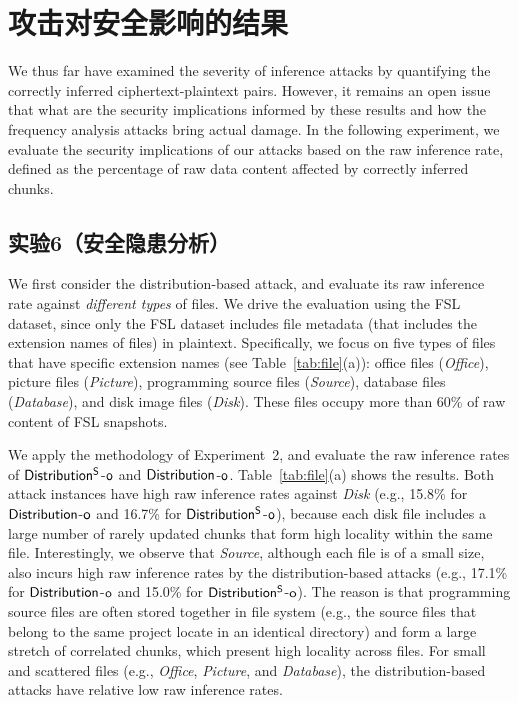 \section{攻击对安全影响的结果}
\label{sec:case}

We thus far have examined the severity of inference attacks by quantifying the correctly inferred ciphertext-plaintext pairs.  However, it remains an open issue that what are the security implications informed by these results and how the frequency analysis attacks bring actual damage. In the following experiment, we evaluate the security implications of our attacks based on the raw inference rate, defined as the percentage of raw data content affected by correctly inferred chunks.   




\subsection{实验6（安全隐患分析）}

We first consider the distribution-based attack, and evaluate its raw
inference rate against {\em different types} of files. We drive the evaluation
using the FSL dataset, since only the FSL dataset includes file metadata (that
includes the extension names of files) in plaintext. Specifically, we focus on
five types of files that have specific extension names (see
Table~\ref{tab:file}(a)): office files ({\em Office}), picture files 
({\em Picture}), programming source files ({\em Source}), database files 
({\em Database}), and disk image files ({\em Disk}). These files occupy more
than 60\% of raw content of FSL snapshots.   

We apply the methodology of Experiment~2, and evaluate the raw inference
rates of $\sf Distribution^S$-$\sf o$ and $\sf Distribution$-$\sf o$. 
Table~\ref{tab:file}(a) shows the results. Both attack instances have high raw
inference rates against {\em Disk} (e.g., 15.8\% for 
$\sf Distribution$-$\sf o$ and 16.7\% for $\sf Distribution^S$-$\sf o$),
because each disk file includes a large number of rarely updated chunks that
form high locality within the same file. Interestingly, we observe that 
{\em Source}, although each file is of a small size, also incurs high raw
inference rates by the distribution-based attacks (e.g., 17.1\% for 
$\sf Distribution$-$\sf o$ and 15.0\% for $\sf Distribution^S$-$\sf o$). The
reason is that programming source files are often stored together in file system
(e.g., the source files that belong to the same project locate in an identical
directory) and form a large stretch of correlated chunks, which present high
locality across files. For small and scattered files (e.g., {\em Office}, 
{\em Picture}, and {\em Database}), the distribution-based attacks have
relative low raw inference rates.     


